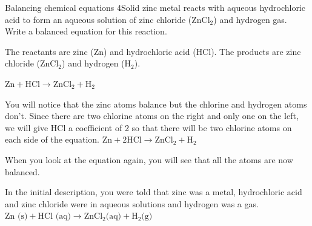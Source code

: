       \noindent
\begin{wex}{Balancing chemical equations 4}{Solid zinc metal reacts with aqueous hydrochloric acid to form an aqueous solution of zinc chloride ($\text{ZnCl}_{2}$) and hydrogen gas. Write a balanced equation for this reaction.}

{
The reactants are zinc ($\text{Zn}$) and hydrochloric acid ($\text{HCl}$). The products are zinc chloride ($\text{ZnCl}_{2}$) and hydrogen ($\text{H}_{2}$).\\
}

{
${\text{Zn} + \text{HCl} \rightarrow \text{ZnCl}_{2} + \text{H}_{2}}$
}

{
You will notice that the zinc atoms balance but the chlorine and hydrogen atoms don't. Since there are two chlorine atoms on the right and only one on the left, we will give HCl a coefficient of 2 so that there will be two chlorine atoms on each side of the equation.
${\text{Zn} + 2\text{HCl} \rightarrow \text{ZnCl}_{2} + \text{H}_{2}}$
}

{
When you look at the equation again, you will see that all the atoms are now balanced.
}

{
In the initial description, you were told that zinc was a metal, hydrochloric acid and zinc chloride were in aqueous solutions and hydrogen was a gas.
$\text{Zn (s)} + \text{HCl (aq)} \rightarrow \text{ZnCl}_{2} \text{(aq)} + \text{H}_{2} \text{(g)}$
}
\end{wex}
    \noindent
\par

